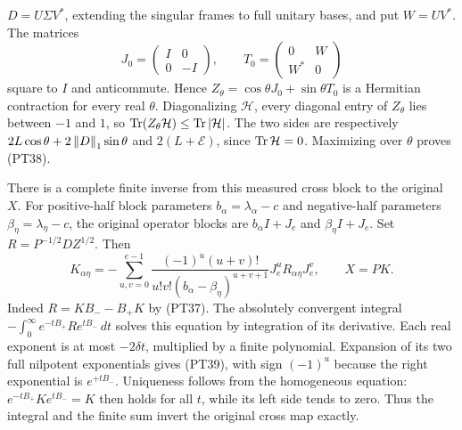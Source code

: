 \(D=U\Sigma V^*\), extending the singular frames to full unitary
bases, and put \(W=UV^*\). The matrices
\[
 J_0=\begin{pmatrix}I&0\\0&-I\end{pmatrix},\qquad
 T_0=\begin{pmatrix}0&W\\W^*&0\end{pmatrix}
\]
square to \(I\) and anticommute. Hence
\(Z_\theta=\cos\theta J_0+\sin\theta T_0\) is a Hermitian
contraction for every real \(\theta\). Diagonalizing
\(\mathcal H\), every diagonal entry of \(Z_\theta\) lies
between \(-1\) and \(1\), so
\(\operatorname{Tr}(Z_\theta\mathcal H)\le\operatorname{Tr}|\mathcal H|\).
The two sides are respectively
\(2L\cos\theta+2\left\lVert D\right\rVert_1\sin\theta\) and
\(2(L+\mathcal E)\), since \(\operatorname{Tr}\mathcal H=0\).
Maximizing over \(\theta\) proves (PT38).

There is a complete finite inverse from this measured cross block
to the original \(X\). For positive-half block parameters
\(b_\alpha=\lambda_\alpha-c\) and negative-half parameters
\(\beta_\eta=\lambda_\eta-c\), the original operator blocks
are \(b_\alpha I+J_e\) and \(\beta_\eta I+J_e\).
Set \(R=P^{-1/2}DZ^{1/2}\). Then
\begin{equation}\tag{PT39}
 K_{\alpha\eta}
 =-\sum_{u,v=0}^{e-1}
 \frac{(-1)^u(u+v)!}
      {u!v!(b_\alpha-\beta_\eta)^{u+v+1}}
 J_e^uR_{\alpha\eta}J_e^v,\qquad X=PK.
\end{equation}
Indeed \(R=KB_--B_+K\) by (PT37). The absolutely convergent
integral \(-\int_0^\infty e^{-tB_+}Re^{tB_-}\,dt\) solves
this equation by integration of its derivative. Each real
exponent is at most \(-2\delta t\), multiplied by a finite
polynomial. Expansion of its two full nilpotent exponentials
gives (PT39), with sign \((-1)^u\) because the right exponential
is \(e^{+tB_-}\). Uniqueness follows from the homogeneous
equation: \(e^{-tB_+}Ke^{tB_-}=K\) then holds for all \(t\),
while its left side tends to zero. Thus the integral and the
finite sum invert the original cross map exactly.

